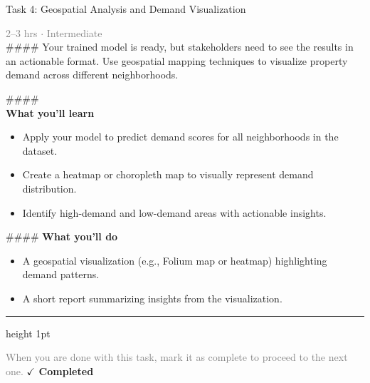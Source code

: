 \documentclass[10pt,a4paper]{article}
\begin{document}
\begin{taskbox}{Task 4: Geospatial Analysis and Demand Visualization}

    {\small \textcolor{gray}{2--3 hrs $\cdot$ Intermediate}}\\[12pt]

    \#\#\#\# 
Your trained model is ready, but stakeholders need to see the results in an actionable format. Use geospatial mapping techniques to visualize property demand across different neighborhoods.

\#\#\#\# \\[10pt]
\vspace{8pt}
{\large \textbf{\textcolor{brandLight}{What you'll learn}}}\\[4pt]
\begin{itemize}
    \item Apply your model to predict demand scores for all neighborhoods in the dataset.
    \item Create a heatmap or choropleth map to visually represent demand distribution.
    \item Identify high-demand and low-demand areas with actionable insights.
\end{itemize}

\#\#\#\# \vspace{8pt}
{\large \textbf{\textcolor{brandLight}{What you'll do}}}\\[4pt]
\begin{itemize}
    \item A geospatial visualization (e.g., Folium map or heatmap) highlighting demand patterns.
    \item A short report summarizing insights from the visualization.\par
\end{itemize}

    \vspace{16pt}

    \textcolor{cardBorder}{\hrule height 1pt}\vspace{8pt}

    \small \textcolor{gray}{When you are done with this task, mark it as complete to proceed to the next one.} \hfill \textbf{\textcolor{brandDark}{$\checkmark$ Completed}}

\end{taskbox}
\end{document}
